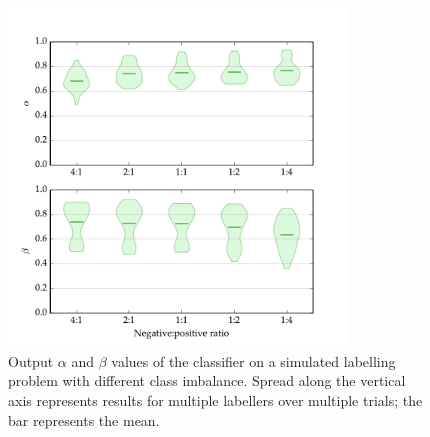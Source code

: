             \begin{figure}
                \centering
                \includegraphics[width=0.8\textwidth]
                    {images/experiments/raykar_class_balance}
                \caption{Output $\alpha$ and $\beta$ values of the
                    \citeauthor{raykar10} classifier on a simulated labelling
                    problem with different class imbalance. Spread along the
                    vertical axis represents results for multiple labellers over
                    multiple trials; the bar represents the mean.}
                \label{fig:raykar-class-balance-ab}
            \end{figure}

